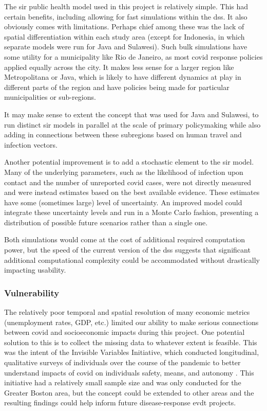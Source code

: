 The \ac{sir} public health model used in this project is relatively simple. This had certain benefits, including allowing for fast simulations within the \ac{dss}. It also obviously comes with limitations. Perhaps chief among these was the lack of spatial differentiation within each study area (except for Indonesia, in which separate models were run for Java and Sulawesi). Such bulk simulations have some utility for a municipality like Rio de Janeiro, as most \ac{covid} response policies applied equally across the city. It makes less sense for a larger region like Metropolitana or Java, which is likely to have different dynamics at play in different parts of the region and have policies being made for particular municipalities or sub-regions.

It may make sense to extent the concept that was used for Java and Sulawesi, to run distinct \ac{sir} models in parallel at the scale of primary policymaking while also adding in connections between these subregions based on human travel and infection vectors.

Another potential improvement is to add a stochastic element to the \ac{sir} model. Many of the underlying parameters, such as the likelihood of infection upon contact and the number of unreported \ac{covid} cases, were not directly measured and were instead estimates based on the best available evidence. These estimates have some (sometimes large) level of uncertainty. An improved model could integrate these uncertainty levels and run in a Monte Carlo fashion, presenting a distribution of possible future scenarios rather than a single one.

Both simulations would come at the cost of additional required computation power, but the speed of the current version of the \ac{dss} suggests that significant additional computational complexity could be accommodated without drastically impacting usability.

\subsubsection{Vulnerability}

The relatively poor temporal and spatial resolution of many economic metrics (unemployment rates, GDP, etc.) limited our ability to make serious connections between \ac{covid} and socioeconomic impacts during this project. One potential solution to this is to collect the missing data to whatever extent is feasible. This was the intent of the Invisible Variables Initiative, which conducted longitudinal, qualitative surveys of individuals over the course of the pandemic to better understand impacts of \ac{covid} on individuals safety, means, and autonomy \cite{turnerInvisibleVariablesImpact2021}. This initiative had a relatively small sample size and was only conducted for the Greater Boston area, but the concept could be extended to other areas and the resulting findings could help inform future disease-response \ac{evdt} projects.

